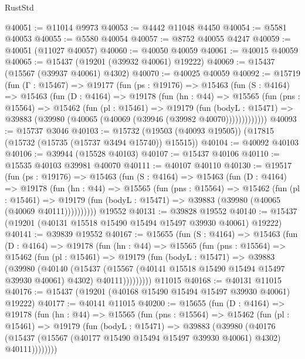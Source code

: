\begin{lexlean}{RustStd}
\begin{coremodule}
@40051 := @11014 @9973
@40053 := @4442 @11048 @4450
@40054 := @5581 @40053
@40055 := @5580 @40054
@40057 := @8752 @40055 @4247
@40059 := @40051 (@11027 @40057)
@40060 := @40050 @40059
@40061 := @40015 @40059
@40065 := @15437 (@19201 (@39932 @40061) @19222)
@40069 := @15437 (@15567 (@39937 @40061) @4302)
@40070 := @40025 @40059
@40092 := @15719
    (fun (Γ : @15467) =>
    @19177
      (fun (ps : @19176) =>
      @15463
        (fun (S : @4164) =>
        @15463
          (fun (D : @4164) =>
          @19178
            (fun (hn : @44) =>
            @15565
              (fun (pns : @15564) =>
              @15462
                (fun (pl : @15461) =>
                @19179
                  (fun (bodyL : @15471) =>
                  @39883 (@39980 (@40065 (@40069 (@39946 (@39982 @40070)))))))))))))
@40093 := @15737 @3046
@40103 := @15732 (@19503 (@40093 @19505)) (@17815 (@15732 (@15735 (@15737 @3494 @15740)) @15515))
@40104 := @40092 @40103
@40106 := @39944 (@15528 @40103)
@40107 := @15437 @40106
@40110 := @15535 @40103 @39981 @40070
@40111 := @40107 @40110
@40130 := @19517
    (fun (ps : @19176) =>
    @15463
      (fun (S : @4164) =>
      @15463
        (fun (D : @4164) =>
        @19178
          (fun (hn : @44) =>
          @15565
            (fun (pns : @15564) =>
            @15462
              (fun (pl : @15461) =>
              @19179 (fun (bodyL : @15471) => @39883 (@39980 (@40065 (@40069 @40111))))))))))
    @19552
@40131 := @39828 @19552
@40140 := @15437 (@19201 (@40131 @15518 @15490 @15494 @15497 @39930 @40061) @19222)
@40141 := @39839 @19552
@40167 := @15655
    (fun (S : @4164) =>
    @15463
      (fun (D : @4164) =>
      @19178
        (fun (hn : @44) =>
        @15565
          (fun (pns : @15564) =>
          @15462
            (fun (pl : @15461) =>
            @19179
              (fun (bodyL : @15471) =>
              @39883
                (@39980
                  (@40140
                    (@15437
                      (@15567 (@40141 @15518 @15490 @15494 @15497 @39930 @40061) @4302)
                      @40111)))))))))
    @11015
@40168 := @40131 @11015
@40176 := @15437 (@19201 (@40168 @15490 @15494 @15497 @39930 @40061) @19222)
@40177 := @40141 @11015
@40200 := @15655
    (fun (D : @4164) =>
    @19178
      (fun (hn : @44) =>
      @15565
        (fun (pns : @15564) =>
        @15462
          (fun (pl : @15461) =>
          @19179
            (fun (bodyL : @15471) =>
            @39883
              (@39980
                (@40176
                  (@15437 (@15567 (@40177 @15490 @15494 @15497 @39930 @40061) @4302) @40111))))))))

\end{coremodule}
\end{lexlean}
